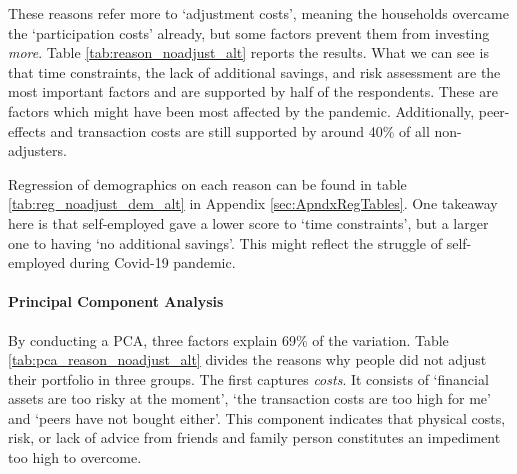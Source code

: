 \documentclass[ProjectABM]{subfiles}
\begin{document}



%




These reasons refer more to `adjustment costs', meaning the households overcame the `participation costs' already, but some factors prevent them from investing \textit{more}. Table \ref{tab:reason_noadjust_alt} reports the results. What we can see is that time constraints, the lack of additional savings, and risk assessment are the most important factors and are supported by half of the respondents. These are factors which might have been most affected by the pandemic. Additionally, peer-effects and transaction costs are still supported by around 40\% of all non-adjusters. 

Regression of demographics on each reason can be found in table \ref{tab:reg_noadjust_dem_alt} in Appendix \ref{sec:ApndxRegTables}. One takeaway here is that self-employed gave a lower score to `time constraints', but a larger one to having `no additional savings'. This might reflect the struggle of self-employed during Covid-19 pandemic.


\paragraph{Principal Component Analysis}
By conducting a PCA, three factors explain 69\% of the variation. Table \ref{tab:pca_reason_noadjust_alt} divides the reasons why people did not adjust their portfolio in three groups. The first captures \textit{costs}. It consists of `financial assets are too risky at the moment', `the transaction costs are too high for me' and `peers have not bought either'. This component indicates that physical costs, risk, or lack of advice from friends and family person constitutes an impediment too high to overcome.
\end{document}
